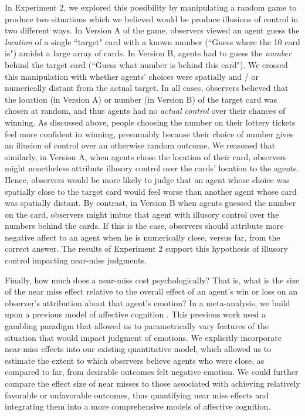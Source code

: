 \documentclass[10pt,letterpaper]{article}
\begin{document}
	
	In Experiment 2, we explored this possibility by manipulating a random game to produce two situations which we believed would be produce illusions of control in two different ways. In Version A of the game, observers viewed an agent guess the \textit{location} of a single ``target" card with a known number (``Guess where the 10 card is") amidst a large array of cards. In Version B, agents had to guess the \textit{number} behind the target card (``Guess what number is behind this card"). We crossed this manipulation with whether agents' choices were spatially and / or numerically distant from the actual target. In all cases, observers believed that the location (in Version A) or number (in Version B) of the target card was chosen at random, and thus agents had no \textit{actual control} over their chances of winning. As discussed above, people choosing the number on their lottery tickets feel more confident in winning, presumably because their choice of number gives an illusion of control over an otherwise random outcome. We reasoned that similarly, in Version A, when agents chose the location of their card, observers might nonetheless attribute illusory control over the cards' location to the agents. Hence, observers would be more likely to judge that an agent whose choice was spatially close to the target card would feel worse than another agent whose card was spatially distant.  By contrast, in Version B when agents guessed the number on the card, observers might imbue that agent with illusory control over the numbers behind the cards. If this is the case, observers should attribute more negative affect to an agent when he is numerically close, versus far, from the correct answer. The results of Experiment 2 support this hypothesis of illusory control impacting near-miss judgments.

	
	Finally, how much does a near-miss cost psychologically? That is, what is the size of the near miss effect relative to the overall effect of an agent's win or loss on an observer's attribution about that agent's emotion? In a meta-analysis, we build upon a previous model of affective cognition \cite{OngAffCog}. This previous work used a gambling paradigm that allowed us to parametrically vary features of the situation that would impact judgment of emotions. We explicitly incorporate near-miss effects into our existing quantitative model, which allowed us to estimate the extent to which observers believe agents who were close, as compared to far, from desirable outcomes felt negative emotion.  We could further compare the effect size of near misses to those associated with achieving relatively favorable or unfavorable outcomes, thus quantifying near miss effects and integrating them into a more comprehensive models of affective cognition.  
\end{document}
